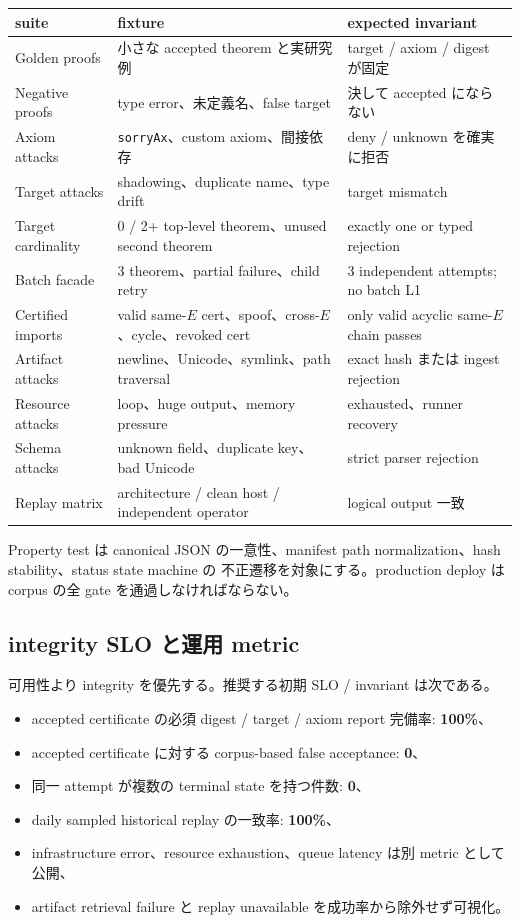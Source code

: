 \documentclass[a4paper,11pt]{ltjsarticle}
\newcommand{\term}[1]{\textbf{\color{TFNavy}#1}}
\newcommand{\code}[1]{\texttt{#1}}
\begin{document}
\begin{tabularx}{0.96\linewidth}{L{38mm}Y L{42mm}}
\toprule
\textbf{suite} & \textbf{fixture} & \textbf{expected invariant} \\
\midrule
Golden proofs & 小さな accepted theorem と実研究例 & target / axiom / digest が固定 \\
Negative proofs & type error、未定義名、false target & 決して accepted にならない \\
Axiom attacks & \code{sorryAx}、custom axiom、間接依存 & deny / unknown を確実に拒否 \\
Target attacks & shadowing、duplicate name、type drift & target mismatch \\
Target cardinality & 0 / 2+ top-level theorem、unused second theorem & exactly one or typed rejection \\
Batch facade & 3 theorem、partial failure、child retry & 3 independent attempts; no batch L1 \\
Certified imports & valid same-$E$ cert、spoof、cross-$E$、cycle、revoked cert & only valid acyclic same-$E$ chain passes \\
Artifact attacks & newline、Unicode、symlink、path traversal & exact hash または ingest rejection \\
Resource attacks & loop、huge output、memory pressure & exhausted、runner recovery \\
Schema attacks & unknown field、duplicate key、bad Unicode & strict parser rejection \\
Replay matrix & architecture / clean host / independent operator & logical output 一致 \\
\bottomrule
\end{tabularx}

Property test は canonical JSON の一意性、manifest path normalization、hash stability、status state machine の
不正遷移を対象にする。production deploy は corpus の全 gate を通過しなければならない。

\subsection{integrity SLO と運用 metric}

可用性より integrity を優先する。推奨する初期 SLO / invariant は次である。

\begin{itemize}
  \item accepted certificate の必須 digest / target / axiom report 完備率: \term{100\%}、
  \item accepted certificate に対する corpus-based false acceptance: \term{0}、
  \item 同一 attempt が複数の terminal state を持つ件数: \term{0}、
  \item daily sampled historical replay の一致率: \term{100\%}、
  \item infrastructure error、resource exhaustion、queue latency は別 metric として公開、
  \item artifact retrieval failure と replay unavailable を成功率から除外せず可視化。
\end{itemize}
\end{document}
